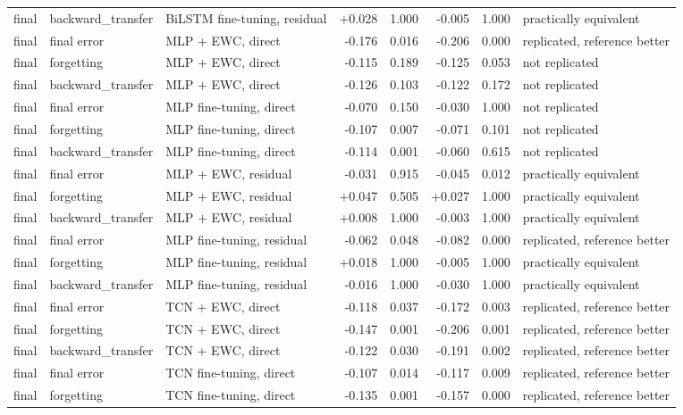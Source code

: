 \begin{table}[t]
\begin{tabular}{lllrrrrl}
    final & backward\_transfer & BiLSTM fine-tuning, residual & +0.028 & 1.000 & -0.005 & 1.000 & practically equivalent \\
    final & final error & MLP + EWC, direct & -0.176 & 0.016 & -0.206 & 0.000 & replicated, reference better \\
    final & forgetting & MLP + EWC, direct & -0.115 & 0.189 & -0.125 & 0.053 & not replicated \\
    final & backward\_transfer & MLP + EWC, direct & -0.126 & 0.103 & -0.122 & 0.172 & not replicated \\
    final & final error & MLP fine-tuning, direct & -0.070 & 0.150 & -0.030 & 1.000 & not replicated \\
    final & forgetting & MLP fine-tuning, direct & -0.107 & 0.007 & -0.071 & 0.101 & not replicated \\
    final & backward\_transfer & MLP fine-tuning, direct & -0.114 & 0.001 & -0.060 & 0.615 & not replicated \\
    final & final error & MLP + EWC, residual & -0.031 & 0.915 & -0.045 & 0.012 & practically equivalent \\
    final & forgetting & MLP + EWC, residual & +0.047 & 0.505 & +0.027 & 1.000 & practically equivalent \\
    final & backward\_transfer & MLP + EWC, residual & +0.008 & 1.000 & -0.003 & 1.000 & practically equivalent \\
    final & final error & MLP fine-tuning, residual & -0.062 & 0.048 & -0.082 & 0.000 & replicated, reference better \\
    final & forgetting & MLP fine-tuning, residual & +0.018 & 1.000 & -0.005 & 1.000 & practically equivalent \\
    final & backward\_transfer & MLP fine-tuning, residual & -0.016 & 1.000 & -0.030 & 1.000 & practically equivalent \\
    final & final error & TCN + EWC, direct & -0.118 & 0.037 & -0.172 & 0.003 & replicated, reference better \\
    final & forgetting & TCN + EWC, direct & -0.147 & 0.001 & -0.206 & 0.001 & replicated, reference better \\
    final & backward\_transfer & TCN + EWC, direct & -0.122 & 0.030 & -0.191 & 0.002 & replicated, reference better \\
    final & final error & TCN fine-tuning, direct & -0.107 & 0.014 & -0.117 & 0.009 & replicated, reference better \\
    final & forgetting & TCN fine-tuning, direct & -0.135 & 0.001 & -0.157 & 0.000 & replicated, reference better \\

\end{tabular}
\end{table}
